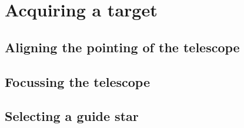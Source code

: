 \documentclass[12pt,twoside,a4paper]{report}
\begin{document}
\section{Acquiring a target}
\label{acquire}


\subsection{Aligning the pointing of the telescope}

\subsection{Focussing the telescope}

\subsection{Selecting a guide star}
\end{document}
